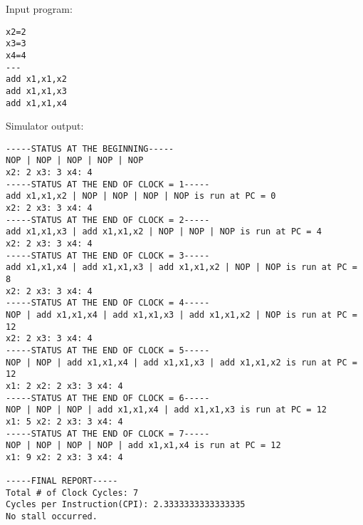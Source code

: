 \noindent Input program:
\vspace{0.5 cm}
\begin{lstlisting}
x2=2
x3=3
x4=4
---
add x1,x1,x2
add x1,x1,x3
add x1,x1,x4
\end{lstlisting}
\vspace{0.5 cm}
Simulator output:
\vspace{0.5 cm}
\begin{lstlisting}
-----STATUS AT THE BEGINNING-----
NOP | NOP | NOP | NOP | NOP
x2: 2 x3: 3 x4: 4 
-----STATUS AT THE END OF CLOCK = 1-----
add x1,x1,x2 | NOP | NOP | NOP | NOP is run at PC = 0
x2: 2 x3: 3 x4: 4 
-----STATUS AT THE END OF CLOCK = 2-----
add x1,x1,x3 | add x1,x1,x2 | NOP | NOP | NOP is run at PC = 4
x2: 2 x3: 3 x4: 4 
-----STATUS AT THE END OF CLOCK = 3-----
add x1,x1,x4 | add x1,x1,x3 | add x1,x1,x2 | NOP | NOP is run at PC = 8
x2: 2 x3: 3 x4: 4 
-----STATUS AT THE END OF CLOCK = 4-----
NOP | add x1,x1,x4 | add x1,x1,x3 | add x1,x1,x2 | NOP is run at PC = 12
x2: 2 x3: 3 x4: 4 
-----STATUS AT THE END OF CLOCK = 5-----
NOP | NOP | add x1,x1,x4 | add x1,x1,x3 | add x1,x1,x2 is run at PC = 12
x1: 2 x2: 2 x3: 3 x4: 4 
-----STATUS AT THE END OF CLOCK = 6-----
NOP | NOP | NOP | add x1,x1,x4 | add x1,x1,x3 is run at PC = 12
x1: 5 x2: 2 x3: 3 x4: 4 
-----STATUS AT THE END OF CLOCK = 7-----
NOP | NOP | NOP | NOP | add x1,x1,x4 is run at PC = 12
x1: 9 x2: 2 x3: 3 x4: 4 

-----FINAL REPORT-----
Total # of Clock Cycles: 7
Cycles per Instruction(CPI): 2.3333333333333335
No stall occurred.
\end{lstlisting}

